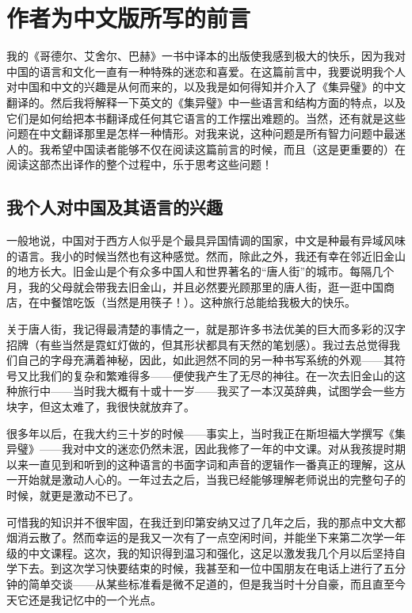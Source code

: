 
\chapter{作者为中文版所写的前言}

我的《哥德尔、艾舍尔、巴赫》一书中译本的出版使我感到极大的快乐，因为我对中国的语言和文化一直有一种特殊的迷恋和喜爱。在这篇前言中，我要说明我个人对中国和中文的兴趣是从何而来的，以及我是如何得知并介入了《集异璧》的中文翻译的。然后我将解释一下英文的《集异璧》中一些语言和结构方面的特点，以及它们是如何给把本书翻译成任何其它语言的工作摆出难题的。当然，还有就是这些问题在中文翻译那里是怎样一种情形。对我来说，这种问题是所有智力问题中最迷人的。我希望中国读者能够不仅在阅读这篇前言的时候，而且（这是更重要的）在阅读这部杰出译作的整个过程中，乐于思考这些问题！

\section*{我个人对中国及其语言的兴趣}

一般地说，中国对于西方人似乎是个最具异国情调的国家，中文是种最有异域风味的语言。我小的时候当然也有这种感觉。然而，除此之外，我还有幸在邻近旧金山的地方长大。旧金山是个有众多中国人和世界著名的“唐人街”的城市。每隔几个月，我的父母就会带我去旧金山，并且必然要光顾那里的唐人街，逛一逛中国商店，在中餐馆吃饭（当然是用筷子！）。这种旅行总能给我极大的快乐。

关于唐人街，我记得最清楚的事情之一，就是那许多书法优美的巨大而多彩的汉字招牌（有些当然是霓虹灯做的，但其形状都具有天然的笔划感）。我过去总觉得我们自己的字母充满着神秘，因此，如此迥然不同的另一种书写系统的外观——其符号又比我们的复杂和繁难得多——便使我产生了无尽的神往。在一次去旧金山的这种旅行中——当时我大概有十或十一岁——我买了一本汉英辞典，试图学会一些方块字，但这太难了，我很快就放弃了。

很多年以后，在我大约三十岁的时候——事实上，当时我正在斯坦福大学撰写《集异璧》——我对中文的迷恋仍然未泯，因此我修了一年的中文课。对从我孩提时期以来一直见到和听到的这种语言的书面字词和声音的逻辑作一番真正的理解，这从一开始就是激动人心的。一年过去之后，当我已经能够理解老师说出的完整句子的时候，就更是激动不已了。

可惜我的知识并不很牢固，在我迁到印第安纳又过了几年之后，我的那点中文大都烟消云散了。然而幸运的是我又一次有了一点空闲时间，并能坐下来第二次学一年级的中文课程。这次，我的知识得到温习和强化，这足以激发我几个月以后坚持自学下去。到这次学习快要结束的时候，我甚至和一位中国朋友在电话上进行了五分钟的简单交谈——从某些标准看是微不足道的，但是我当时十分自豪，而且直至今天它还是我记忆中的一个光点。

